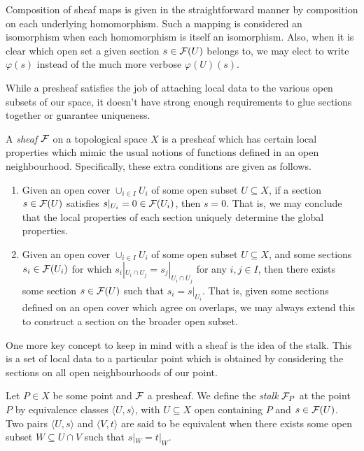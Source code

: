 \documentclass[12pt]{article}
\begin{document}
Composition of sheaf maps is given in the straightforward manner by composition on each underlying homomorphism.
Such a mapping is considered an isomorphism when each homomorphism is itself an isomorphism.
Also, when it is clear which open set a given section $s \in \mathcal{F}(U)$ belongs to, 
we may elect to write $\varphi(s)$ instead of the much more verbose $\varphi(U)(s)$.

While a presheaf satisfies the job of attaching local data to the various open subsets of our space,
it doesn't have strong enough requirements to glue sections together or guarantee uniqueness.

\begin{definition}[Sheaf]
    A \textit{sheaf} $\mathcal{F}$ on a topological space $X$ is a presheaf which has certain local properties which mimic the usual notions of functions defined in an open neighbourhood. Specifically, these extra conditions are given as follows.
    \begin{enumerate}
        \item Given an open cover $\cup_{i \in I} U_i$ of some open subset $U \subseteq X$, 
        if a section $s \in \mathcal{F}(U)$ satisfies $s|_{U_i} = 0 \in \mathcal{F}(U_i)$, then $s = 0$. 
        That is, we may conclude that the local properties of each section uniquely determine the global properties.
        \item Given an open cover $\cup_{i \in I} U_i$ of some open subset $U \subseteq X$, 
        and some sections $s_i \in \mathcal{F}(U_i)$ for which $s_i|_{U_i \cap U_j} = s_j|_{U_i \cap U_j}$ for any $i, j \in I$, 
        then there exists some section $s \in \mathcal{F}(U)$ such that $s_i = s|_{U_i}$.
        That is, given some sections defined on an open cover which agree on overlaps, we may always extend this to construct a section on the broader open subset.
    \end{enumerate}
\end{definition}

One more key concept to keep in mind with a sheaf is the idea of the stalk.
This is a set of local data to a particular point which is obtained by considering the sections on all open neighbourhoods of our point.

\begin{definition}[Stalk]
    Let $P \in X$ be some point and $\mathcal{F}$ a presheaf. 
    We define the \textit{stalk} $\mathcal{F}_P$ at the point $P$ by equivalence classes $\langle U, s \rangle$,
    with $U \subseteq X$ open containing $P$ and $s \in \mathcal{F}(U)$.
    Two pairs $\langle U, s \rangle$ and $\langle V, t \rangle$ are said to be equivalent when there exists some open subset $W \subseteq U \cap V$ such that $s|_W = t|_W$.
\end{definition}
\end{document}
